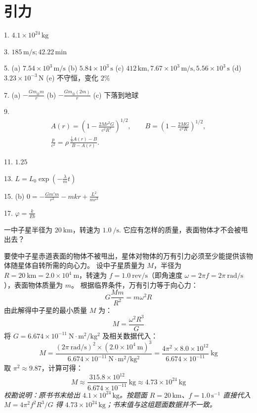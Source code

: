 \chapter{引力}

\begin{oddanswers}
1. $4.1 \times 10^{24}\,\mathrm{kg}$

3. $185\,\mathrm{m/s} ; 42.22\,\mathrm{min}$

5. (a) $7.54 \times 10^3\,\mathrm{m/s}$
(b) $5.84 \times 10^3\,\mathrm{s}$
(c) $412\,\mathrm{km}, 7.67 \times 10^3\,\mathrm{m/s}, 5.56 \times 10^3\,\mathrm{s}$
(d) $3.23 \times 10^{-3}\,\mathrm{N}$
(e) 不守恒，变化 $2\%$

7. (a) $-\frac{Gm_{\oplus}m}{r}$
(b) $-\frac{Gm_{\oplus}(2m)}{r}$
(c) 下落到地球

9. 
\[
\begin{gathered}
A(r)=\left(1-\frac{2Mr^2G}{c^2R^3}\right)^{1/2},\qquad
B=\left(1-\frac{2MG}{c^2R}\right)^{1/2},\\
\frac{p}{c^2}=\rho\,\frac{\frac13 A(r)-B}{B-A(r)}.
\end{gathered}
\]

11. $1.25$

13. $L = L_0 \exp\left(-\frac{\lambda}{m}t\right)$

15. (b) $0 = -\frac{Gm'm}{r^2} - mkr + \frac{L^2}{mr^3}$

17. $\varphi = \frac{k}{Eb}$
\end{oddanswers}

\begin{exercise}\label{ex:4.1}
一中子星半径为 $20 \ \mathrm{km}$，转速为 $1.0 \ \mathrm{/s}$. 它应有怎样的质量，表面物体才不会被甩出去？
\end{exercise}
\begin{solution}
要使中子星赤道表面的物体不被甩出，星体对物体的万有引力必须至少能提供该物体随星体自转所需的向心力。
设中子星质量为 $M$，半径为 $R = 20 \ \mathrm{km} = 2.0 \times 10^4 \ \mathrm{m}$，转速为 $f = 1.0 \ \mathrm{rev/s}$（即角速度 $\omega = 2\pi f = 2\pi \ \mathrm{rad/s}$），表面物体质量为 $m$。
根据临界条件，万有引力等于向心力：
$$ G\frac{Mm}{R^2} = m\omega^2 R $$
由此解得中子星的最小质量 $M$ 为：
$$ M = \frac{\omega^2 R^3}{G} $$
将 $G = 6.674 \times 10^{-11} \ \mathrm{N \cdot m^2 / kg^2}$ 及相关数据代入：
$$ M = \frac{(2\pi \ \mathrm{rad/s})^2 \times (2.0 \times 10^4 \ \mathrm{m})^3}{6.674 \times 10^{-11} \ \mathrm{N \cdot m^2 / kg^2}} = \frac{4\pi^2 \times 8.0 \times 10^{12}}{6.674 \times 10^{-11}} \ \mathrm{kg} $$
取 $\pi^2 \approx 9.87$，计算可得：
$$ M \approx \frac{315.8 \times 10^{12}}{6.674 \times 10^{-11}} \ \mathrm{kg} \approx 4.73 \times 10^{24} \ \mathrm{kg} $$
\textit{校勘说明：原书书末给出 $4.1\times10^{24}\,\mathrm{kg}$。按题面 $R=20\,\mathrm{km}$、$f=1.0\,\mathrm{s^{-1}}$ 直接代入 $M=4\pi^2f^2R^3/G$ 得 $4.73\times10^{24}\,\mathrm{kg}$；书末值与这组题面数据并不一致。}
\end{solution}

